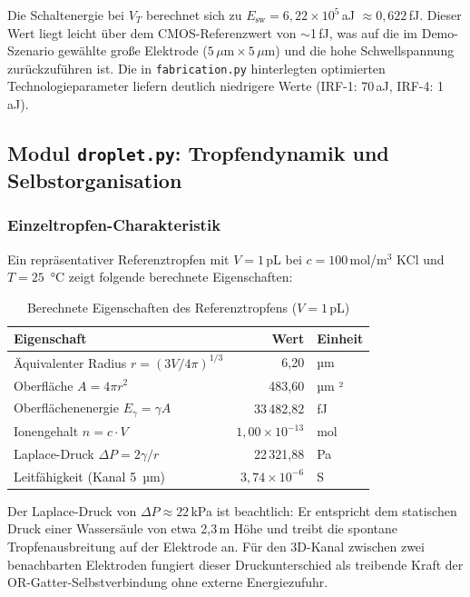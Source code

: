 ﻿\documentclass[a4paper,12pt]{scrreprt}
\theoremstyle{definition}
\begin{document}
Die Schaltenergie bei $V_T$ berechnet sich zu $E_\text{sw} = 6{,}22 \times 10^5$\,aJ $\approx 0{,}622$\,fJ.
Dieser Wert liegt leicht über dem CMOS-Referenzwert von $\sim$1\,fJ, was auf die
im Demo-Szenario gewählte große Elektrode ($5\,\mu\text{m} \times 5\,\mu\text{m}$)
und die hohe Schwellspannung zurückzuführen ist. Die in \texttt{fabrication.py}
hinterlegten optimierten Technologieparameter liefern deutlich niedrigere Werte
(IRF-1: 70\,aJ, IRF-4: 1\,aJ).

\subsection{Modul \texttt{droplet.py}: Tropfendynamik und Selbstorganisation}
\label{subsec:demo_droplet}

\subsubsection{Einzeltropfen-Charakteristik}

Ein repräsentativer Referenztropfen mit $V = 1$\,pL bei $c = 100$\,mol/m$^3$
KCl und $T = 25$\, °C zeigt folgende berechnete Eigenschaften:

\begin{table}[H]
	\centering
	\caption{Berechnete Eigenschaften des Referenztropfens ($V = 1$\,pL)}
	\label{tab:tropfen}
	\begin{tabular}{lrl}
		\toprule
		\textbf{Eigenschaft} & \textbf{Wert} & \textbf{Einheit} \\
		\midrule
		Äquivalenter Radius $r = (3V/4\pi)^{1/3}$ & 6,20 &  µm \\
		Oberfläche $A = 4\pi r^2$                 & 483,60 &  µm ² \\
		Oberflächenenergie $E_\gamma = \gamma A$  & 33\,482,82 & fJ \\
		Ionengehalt $n = c \cdot V$               & $1{,}00 \times 10^{-13}$ & mol \\
		Laplace-Druck $\Delta P = 2\gamma/r$      & 22\,321,88 & Pa \\
		Leitfähigkeit (Kanal 5\, µm)               & $3{,}74 \times 10^{-6}$ & S \\
		\bottomrule
	\end{tabular}
\end{table}

Der Laplace-Druck von $\Delta P \approx 22$\,kPa ist beachtlich: Er entspricht
dem statischen Druck einer Wassersäule von etwa 2,3\,m Höhe und treibt die
spontane Tropfenausbreitung auf der Elektrode an. Für den 3D-Kanal zwischen
zwei benachbarten Elektroden fungiert dieser Druckunterschied als treibende
Kraft der OR-Gatter-Selbstverbindung ohne externe Energiezufuhr.
\end{document}
